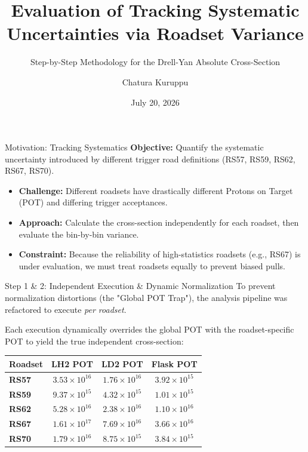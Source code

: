 \documentclass[aspectratio=169]{beamer}
\title[Roadset Systematics]{Evaluation of Tracking Systematic Uncertainties via Roadset Variance}
\subtitle{Step-by-Step Methodology for the Drell-Yan Absolute Cross-Section}
\author{Chatura Kuruppu}
\institute[Fermilab / NMSU]{New Mexico State University \\ Fermilab SpinQuest/SeaQuest}
\date{July 20, 2026}
\begin{document}
\begin{frame}
    \titlepage
\end{frame}

\begin{frame}{Motivation: Tracking Systematics}
    \textbf{Objective:} Quantify the systematic uncertainty introduced by different trigger road definitions (RS57, RS59, RS62, RS67, RS70).
    \vspace{0.5cm}
    \begin{itemize}
        \item \textbf{Challenge:} Different roadsets have drastically different Protons on Target (POT) and differing trigger acceptances.
        \item \textbf{Approach:} Calculate the cross-section independently for each roadset, then evaluate the bin-by-bin variance.
        \item \textbf{Constraint:} Because the reliability of high-statistics roadsets (e.g., RS67) is under evaluation, we must treat roadsets equally to prevent biased pulls.
    \end{itemize}
\end{frame}

\begin{frame}{Step 1 \& 2: Independent Execution \& Dynamic Normalization}
    To prevent normalization distortions (the "Global POT Trap"), the analysis pipeline was refactored to execute \textit{per roadset}. 
    \vspace{0.3cm}
    
    Each execution dynamically overrides the global POT with the roadset-specific POT to yield the true independent cross-section:
    \vspace{0.3cm}
    
    \begin{table}[]
        \centering
        \begin{tabular}{@{}lccc@{}}
        \toprule
        \textbf{Roadset} & \textbf{LH2 POT} & \textbf{LD2 POT} & \textbf{Flask POT} \\ \midrule
        \textbf{RS57} & $3.53 \times 10^{16}$ & $1.76 \times 10^{16}$ & $3.92 \times 10^{15}$ \\
        \textbf{RS59} & $9.37 \times 10^{15}$ & $4.32 \times 10^{15}$ & $1.01 \times 10^{15}$ \\
        \textbf{RS62} & $5.28 \times 10^{16}$ & $2.38 \times 10^{16}$ & $1.10 \times 10^{16}$ \\
        \textbf{RS67} & $1.61 \times 10^{17}$ & $7.69 \times 10^{16}$ & $3.66 \times 10^{16}$ \\
        \textbf{RS70} & $1.79 \times 10^{16}$ & $8.75 \times 10^{15}$ & $3.84 \times 10^{15}$ \\ \bottomrule
        \end{tabular}
    \end{table}
\end{frame}
\end{document}
